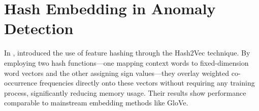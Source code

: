 \begin{ZhChapter}
    \begin{table*}[htbp]
        \centering
        \caption{Examples of Field-Value Tokenization in IoT Network Traffic Data}
        \label{tab:tokenization_examples}
        \vspace{0.5em}
    \end{table*}


    \newpage
    \section{Hash Embedding in Anomaly Detection} \label{sec:hash_embedding}  %
    In \cite{argerich2016hash2vec}, \citeauthor{argerich2016hash2vec} introduced the use of feature hashing through the Hash2Vec technique. By employing two hash functions—one mapping context words to fixed-dimension word vectors and the other assigning sign values—they overlay weighted co-occurrence frequencies directly onto these vectors without requiring any training process, significantly reducing memory usage. Their results show performance comparable to mainstream embedding methods like GloVe.


\end{ZhChapter}
